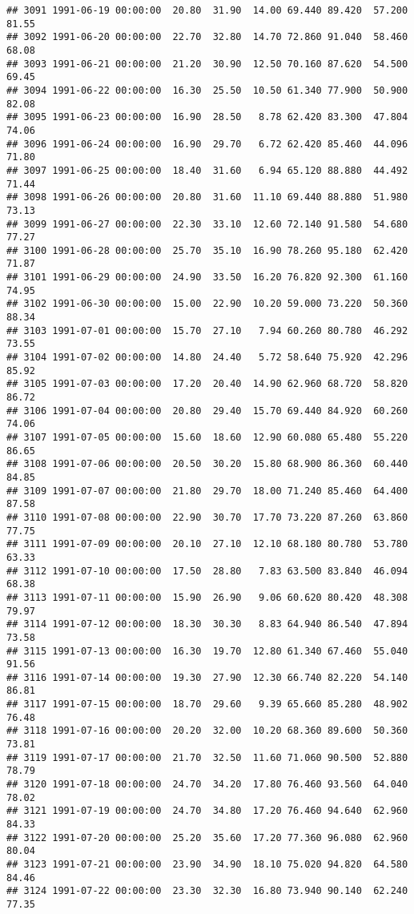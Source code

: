 \documentclass{article}\usepackage{graphicx, color}
\makeatletter
\newenvironment{kframe}{%
 \def\at@end@of@kframe{}%
 \ifinner\ifhmode%
  \def\at@end@of@kframe{\end{minipage}}%
  \begin{minipage}{\columnwidth}%
 \fi\fi%
 \def\FrameCommand##1{\hskip\@totalleftmargin \hskip-\fboxsep
 \colorbox{shadecolor}{##1}\hskip-\fboxsep
     \hskip-\linewidth \hskip-\@totalleftmargin \hskip\columnwidth}%
 \MakeFramed {\advance\hsize-\width
   \@totalleftmargin\z@ \linewidth\hsize
   \@setminipage}}%
 {\par\unskip\endMakeFramed%
 \at@end@of@kframe}
\newenvironment{knitrout}{}{} %
\makeatother
\begin{document}
\begin{knitrout}
\begin{kframe}
\begin{verbatim}
## 3091 1991-06-19 00:00:00  20.80  31.90  14.00 69.440 89.420  57.200  81.55
## 3092 1991-06-20 00:00:00  22.70  32.80  14.70 72.860 91.040  58.460  68.08
## 3093 1991-06-21 00:00:00  21.20  30.90  12.50 70.160 87.620  54.500  69.45
## 3094 1991-06-22 00:00:00  16.30  25.50  10.50 61.340 77.900  50.900  82.08
## 3095 1991-06-23 00:00:00  16.90  28.50   8.78 62.420 83.300  47.804  74.06
## 3096 1991-06-24 00:00:00  16.90  29.70   6.72 62.420 85.460  44.096  71.80
## 3097 1991-06-25 00:00:00  18.40  31.60   6.94 65.120 88.880  44.492  71.44
## 3098 1991-06-26 00:00:00  20.80  31.60  11.10 69.440 88.880  51.980  73.13
## 3099 1991-06-27 00:00:00  22.30  33.10  12.60 72.140 91.580  54.680  77.27
## 3100 1991-06-28 00:00:00  25.70  35.10  16.90 78.260 95.180  62.420  71.87
## 3101 1991-06-29 00:00:00  24.90  33.50  16.20 76.820 92.300  61.160  74.95
## 3102 1991-06-30 00:00:00  15.00  22.90  10.20 59.000 73.220  50.360  88.34
## 3103 1991-07-01 00:00:00  15.70  27.10   7.94 60.260 80.780  46.292  73.55
## 3104 1991-07-02 00:00:00  14.80  24.40   5.72 58.640 75.920  42.296  85.92
## 3105 1991-07-03 00:00:00  17.20  20.40  14.90 62.960 68.720  58.820  86.72
## 3106 1991-07-04 00:00:00  20.80  29.40  15.70 69.440 84.920  60.260  74.06
## 3107 1991-07-05 00:00:00  15.60  18.60  12.90 60.080 65.480  55.220  86.65
## 3108 1991-07-06 00:00:00  20.50  30.20  15.80 68.900 86.360  60.440  84.85
## 3109 1991-07-07 00:00:00  21.80  29.70  18.00 71.240 85.460  64.400  87.58
## 3110 1991-07-08 00:00:00  22.90  30.70  17.70 73.220 87.260  63.860  77.75
## 3111 1991-07-09 00:00:00  20.10  27.10  12.10 68.180 80.780  53.780  63.33
## 3112 1991-07-10 00:00:00  17.50  28.80   7.83 63.500 83.840  46.094  68.38
## 3113 1991-07-11 00:00:00  15.90  26.90   9.06 60.620 80.420  48.308  79.97
## 3114 1991-07-12 00:00:00  18.30  30.30   8.83 64.940 86.540  47.894  73.58
## 3115 1991-07-13 00:00:00  16.30  19.70  12.80 61.340 67.460  55.040  91.56
## 3116 1991-07-14 00:00:00  19.30  27.90  12.30 66.740 82.220  54.140  86.81
## 3117 1991-07-15 00:00:00  18.70  29.60   9.39 65.660 85.280  48.902  76.48
## 3118 1991-07-16 00:00:00  20.20  32.00  10.20 68.360 89.600  50.360  73.81
## 3119 1991-07-17 00:00:00  21.70  32.50  11.60 71.060 90.500  52.880  78.79
## 3120 1991-07-18 00:00:00  24.70  34.20  17.80 76.460 93.560  64.040  78.02
## 3121 1991-07-19 00:00:00  24.70  34.80  17.20 76.460 94.640  62.960  84.33
## 3122 1991-07-20 00:00:00  25.20  35.60  17.20 77.360 96.080  62.960  80.04
## 3123 1991-07-21 00:00:00  23.90  34.90  18.10 75.020 94.820  64.580  84.46
## 3124 1991-07-22 00:00:00  23.30  32.30  16.80 73.940 90.140  62.240  77.35

\end{verbatim}
\end{kframe}
\end{knitrout}
\end{document}
